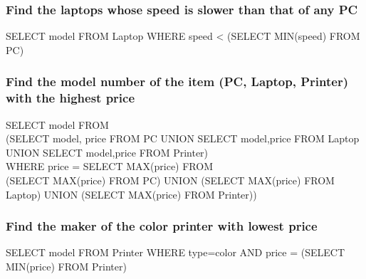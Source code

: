 \documentclass[12pt, a4paper]{article}
\begin{document}
			\subsubsection{Find the laptops whose speed is slower than that of any PC}
				SELECT model FROM Laptop WHERE speed < (SELECT MIN(speed) FROM PC)
			\subsubsection{Find the model number of the item (PC, Laptop, Printer) with the highest price}
				SELECT model FROM \\
					(SELECT model, price FROM PC UNION SELECT model,price FROM Laptop UNION SELECT model,price FROM Printer) \\
					WHERE price = SELECT MAX(price) FROM \\
						(SELECT MAX(price) FROM PC) UNION (SELECT MAX(price) FROM Laptop) UNION  (SELECT MAX(price) FROM Printer)) 
			\subsubsection{Find the maker of the color printer with lowest price}
				SELECT model FROM Printer WHERE type=color AND price = (SELECT MIN(price) FROM Printer)
			
				
				
					
				
			
\end{document}
